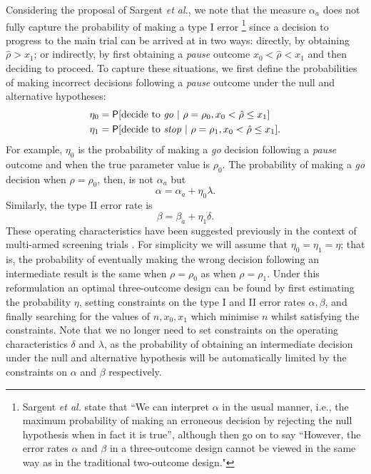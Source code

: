 \documentclass{bmcart}
\newcommand{\PR}{{\mathsf P}}
\begin{document}
Considering the proposal of Sargent \emph{et al.}, we note that the measure $\alpha_a$ does not fully capture the probability of making a type I error \footnote{Sargent \emph{et al.}  state that ``We  can interpret $\alpha$ in the usual  manner,  i.e., the  maximum probability of making an erroneous decision by rejecting the null hypothesis when in fact it is true'', although then go on to say ``However, the error rates $\alpha$ and $\beta$ in a three-outcome design cannot be viewed in the same way as in the traditional two-outcome design."} since a decision to progress to the main trial can be arrived at in two ways: directly, by obtaining $\hat{\rho} > x_1$; or indirectly, by first obtaining a \emph{pause} outcome $x_0 < \hat{\rho} < x_1$ and then deciding to proceed. To capture these situations, we first define the probabilities of making incorrect decisions following a \emph{pause} outcome under the null and alternative hypotheses:
\begin{align}
\eta_0 &= \PR[\text{decide to \emph{go}} ~|~ \rho = \rho_0, x_0 < \hat{\rho} \leq x_1] \\
\eta_1 &= \PR[\text{decide to \emph{stop}} ~|~ \rho = \rho_1, x_0 < \hat{\rho} \leq x_1].
\end{align}
For example, $\eta_0$ is the probability of making a \emph{go} decision following a \emph{pause} outcome and when the true parameter value is $\rho_0$. The probability of making a \emph{go} decision when $\rho = \rho_0$, then, is not $\alpha_a$ but
$$
\alpha = \alpha_a + \eta_0 \lambda.
$$
Similarly, the type II error rate is
$$
\beta = \beta_a + \eta_1 \delta.
$$
These operating characteristics have been suggested previously in the context of multi-armed screening trials \cite{Sargent2001a, Dehbi2020}. For simplicity we will assume that $\eta_0 = \eta_1 = \eta$; that is, the probability of eventually making the wrong decision following an intermediate result is the same when $\rho = \rho_0$ as when $\rho = \rho_1$. Under this reformulation an optimal three-outcome design can be found by first estimating the probability $\eta$, setting constraints on the type I and II error rates $\alpha, \beta$, and finally searching for the values of  $n, x_0, x_1$ which minimise $n$ whilst satisfying the constraints. Note that we no longer need to set constraints on the operating characteristics $\delta$ and $\lambda$, as the probability of obtaining an intermediate decision under the null and alternative hypothesis will be automatically limited by the constraints on $\alpha$ and $\beta$ respectively.
\end{document}
